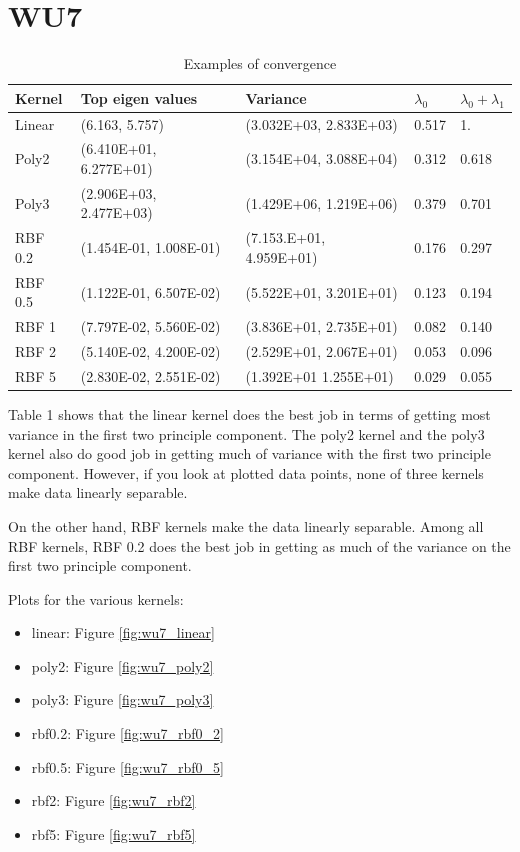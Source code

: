 \section*{WU7}
\begin{table}[here]
	\centering %
	\begin{tabular}{l l l l l} %
		\hline\hline %
		Kernel & Top eigen values & Variance & $\lambda_0$ & $\lambda_0 + \lambda_1$  \\ [0.5ex] %
		\hline %
		Linear & (6.163,   5.757) & (3.032E+03,  2.833E+03) & 0.517 & 1. \\ %
		Poly2 & (6.410E+01,  6.277E+01) & (3.154E+04,  3.088E+04) & 0.312 & 0.618 \\
		Poly3 & (2.906E+03,  2.477E+03) & (1.429E+06,  1.219E+06) & 0.379 & 0.701 \\
		RBF 0.2 & (1.454E-01,  1.008E-01) & (7.153.E+01,   4.959E+01) & 0.176 & 0.297 \\
		RBF 0.5 & (1.122E-01,  6.507E-02) & (5.522E+01,  3.201E+01) & 0.123 & 0.194 \\
		RBF 1 & (7.797E-02,  5.560E-02) & (3.836E+01,  2.735E+01) & 0.082 & 0.140 \\
		RBF 2 & (5.140E-02,  4.200E-02) & (2.529E+01,  2.067E+01) & 0.053 & 0.096 \\
		RBF 5 & (2.830E-02,  2.551E-02) & (1.392E+01  1.255E+01) & 0.029 & 0.055 \\ [1ex] %
		\hline %
	\end{tabular}
	\label{table:wu7} %
	\caption{Examples of convergence} %
\end{table}

Table 1 shows that the linear kernel does the best job in terms of 
getting most variance in the first two principle component. The poly2 kernel and
the poly3 kernel also do good job in getting much of variance with the first two 
principle component.
However, if you look at plotted data points, none of three kernels make
data linearly separable.

On the other hand, RBF kernels make the data linearly separable. Among all RBF kernels, 
RBF 0.2 does the best job in getting as much of the variance on the first two principle 
component.

Plots for the various kernels:
\begin{itemize}
	\item linear: Figure \ref{fig:wu7_linear}
	\item poly2: Figure \ref{fig:wu7_poly2}
	\item poly3: Figure \ref{fig:wu7_poly3}
	\item rbf0.2: Figure \ref{fig:wu7_rbf0_2}
	\item rbf0.5: Figure \ref{fig:wu7_rbf0_5}
	\item rbf2: Figure \ref{fig:wu7_rbf2}
	\item rbf5: Figure \ref{fig:wu7_rbf5}
\end{itemize}


